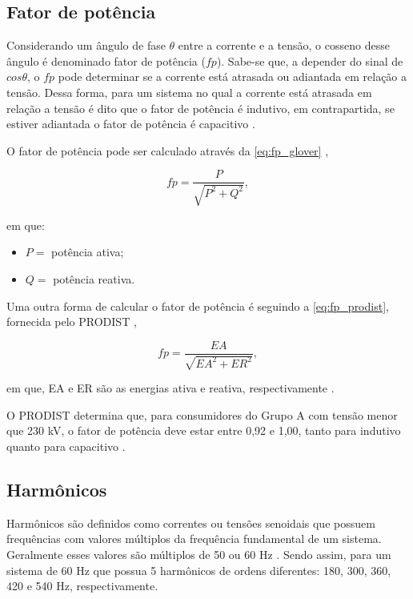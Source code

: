 \subsection{Fator de potência}

Considerando um ângulo de fase $\theta$ entre a corrente e a tensão, o cosseno desse ângulo é denominado fator de potência ($fp$). Sabe-se que, a depender do sinal de $cos\theta$, o $fp$ pode determinar se a corrente está atrasada ou adiantada em relação a tensão. Dessa forma, para um sistema no qual a corrente está atrasada em relação a tensão é dito que o fator de potência é indutivo, em contrapartida, se estiver adiantada o fator de potência é capacitivo \cite{ref:glover_2017}.

O fator de potência pode ser calculado através da \autoref{eq:fp_glover} \cite{ref:glover_2017},

\begin{equation}
  fp = \frac{P}{\sqrt{P^2 + Q^2}},
  \label{eq:fp_glover}
\end{equation}

\noindent
em que:

\begin{itemize}
  \item $P =$ potência ativa;
  \item $Q =$ potência reativa.
\end{itemize}

Uma outra forma de calcular o fator de potência é seguindo a \autoref{eq:fp_prodist}, fornecida pelo PRODIST \cite{ref:ANEEL2021},

\begin{equation}
  fp = \frac{EA}{\sqrt{EA^2 + ER^2}},
  \label{eq:fp_prodist}
\end{equation}

\noindent
em que, EA e ER são as energias ativa e reativa, respectivamente \cite{ref:ANEEL2021}.

O PRODIST determina que, para consumidores do Grupo A com tensão menor que 230 kV, o fator de potência deve estar entre 0,92 e 1,00, tanto para indutivo quanto para capacitivo \cite{ref:ANEEL2021}.

\subsection{Harmônicos}

Harmônicos são definidos como correntes ou tensões senoidais que possuem frequências com valores múltiplos da frequência fundamental de um sistema. Geralmente esses valores são múltiplos de 50 ou 60 Hz \cite{ref:fuchs_2015}. Sendo assim, para um sistema de 60 Hz que possua 5 harmônicos de ordens diferentes: 180, 300, 360, 420 e 540 Hz, respectivamente.

